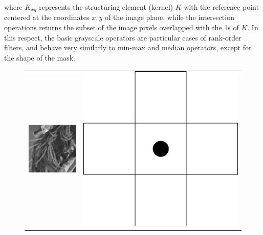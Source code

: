 \documentclass[review]{elsarticle}
\begin{document}
where $K_{xy}$ represents the structuring element (kernel) $K$ with the reference point centered at the coordinates $x,y$ of the image plane, while the intersection operations returns the subset of the image pixels overlapped with the 1s of $K$. In this respect, the basic grayscale operators are particular cases of rank-order filters, and behave very similarly to min-max and median operators, except for the shape of the mask.

\begin{figure}[h!]
	\centering
	\begin{tabular}{cc}
		\centering
		\includegraphics[scale=1]{original.eps} & \includegraphics[scale=0.1]{mask.png} \\

\end{tabular}
\end{figure}
\end{document}
